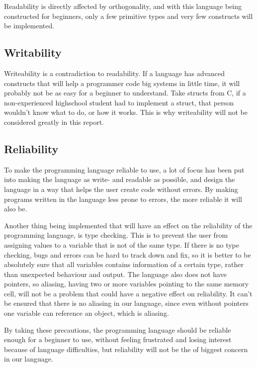 Readability is directly affected by orthogonality, and with this language being constructed for beginners, only a few primitive types and very few constructs will be implemented.

\subsection{Writability}
Writeability is a contradiction to readability. If a language has advanced constructs that will help a programmer code big systems in little time, it will probably not be as easy for a beginner to understand. Take structs from C, if a non-experienced highschool student had to implement a struct, that person wouldn't know what to do, or how it works. This is why writeability will not be considered greatly in this report.

\subsection{Reliability}
To make the programming language reliable to use, a lot of focus has been put into making the language as write- and readable as possible, and design the language in a way that helps the user create code without errors. By making programs written in the language less prone to errors, the more reliable it will also be.

Another thing being implemented that will have an effect on the reliability of the programming language, is type checking. This is to prevent the user from assigning values to a variable that is not of the same type. If there is no type checking, bugs and errors can be hard to track down and fix, so it is better to be absolutely sure that all variables contains information of a certain type, rather than unexpected behaviour and output. 
The language also does not have pointers, so aliasing, having two or more variables pointing to the same memory cell, will not be a problem that could have a negative effect on reliability. It can't be ensured that there is no aliasing in our language, since even without pointers one variable can reference an object, which is aliasing. 

By taking these precautions, the programming language should be reliable enough for a beginner to use, without feeling frustrated and losing interest because of language difficulties, but reliability will not be the of biggest concern in our language. 


